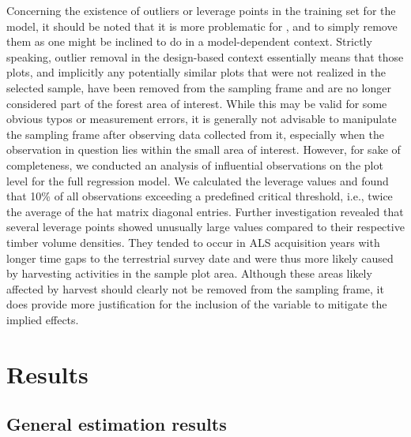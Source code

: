 



Concerning the existence of outliers or leverage points in the training set for the model, it should be noted that it is more problematic for \psmall{}, \psynth{} and \extpsynth{} to simply remove them as one might be inclined to do in a model-dependent context. Strictly speaking, outlier removal in the design-based context essentially means that those plots, and implicitly any potentially similar plots that were not realized in the selected sample, have been removed from the sampling frame and are no longer considered part of the forest area of interest. While this may be valid for some obvious typos or measurement errors, it is generally not advisable to manipulate the sampling frame after observing data collected from it, especially when the observation in question lies within the small area of interest. However, for sake of completeness, we conducted an analysis of influential observations \citep[pp. 160--167]{fahrmeir2013} on the plot level for the full regression model. We calculated the leverage values and found that 10\% of all observations exceeding a predefined critical threshold, i.e., twice the average of the hat matrix diagonal entries. Further investigation revealed that several leverage points showed unusually large \meanheight{} values compared to their respective timber volume densities. They tended to occur in ALS acquisition years with longer time gaps to the terrestrial survey date and were thus more likely caused by harvesting activities in the sample plot area.  Although these areas likely affected by harvest should clearly not be removed from the sampling frame, it does provide more justification for the inclusion of the \alsyear{} variable to mitigate the implied effects.



\section{Results}
\label{sec:sae:Res}


\subsection{General estimation results}
\label{sec:feasest}

